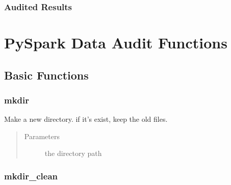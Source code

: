 \documentclass[letterpaper,12pt,english]{sphinxmanual}
\begin{document}
\subsection{Audited Results}
\label{\detokenize{install:audited-results}}\begin{quote}

\begin{figure}[htbp]
\centering

\noindent{}
\end{figure}
\end{quote}


\chapter{PySpark Data Audit Functions}
\label{\detokenize{basics:pyspark-data-audit-functions}}\label{\detokenize{basics:basics}}\label{\detokenize{basics::doc}}

\section{Basic Functions}
\label{\detokenize{basics:basic-functions}}

\subsection{mkdir}
\label{\detokenize{basics:mkdir}}

\begin{fulllineitems}
Make a new directory. if it’s exist, keep the old files.
\begin{quote}\begin{description}
\item[{Parameters}] \leavevmode
{} \textendash{} the directory path

\end{description}\end{quote}

\end{fulllineitems}



\subsection{mkdir\_clean}
\label{\detokenize{basics:mkdir-clean}}
\end{document}
